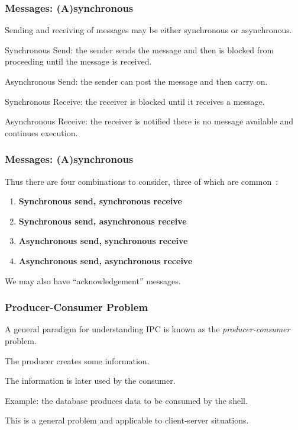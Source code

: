 \begin{frame}
\frametitle{Messages: (A)synchronous}

Sending and receiving of messages may be either synchronous or asynchronous. 

Synchronous Send: the sender sends the message and then is blocked from proceeding until the message is received. 

Asynchronous Send: the sender can post the message and then carry on. 

Synchronous Receive: the receiver is blocked until it receives a message. 

Asynchronous Receive: the receiver is notified there is no message available and continues execution.

\end{frame}

\begin{frame}
\frametitle{Messages: (A)synchronous}

Thus there are four combinations to consider, three of which are common~\cite{mte241}:

\begin{enumerate}
	\item \textbf{Synchronous send, synchronous receive} 
	\item \textbf{Synchronous send, asynchronous receive}
	\item \textbf{Asynchronous send, synchronous receive}
	\item \textbf{Asynchronous send, asynchronous receive}
\end{enumerate}

We may also have ``acknowledgement'' messages.

\end{frame}

\begin{frame}
\frametitle{Producer-Consumer Problem}

A general paradigm for understanding IPC is known as the \textit{producer-consumer} problem. 

The \alert{producer} creates some information.

The information is later used by the \alert{consumer}. 

Example: the database produces data to be consumed by the shell. 

This is a general problem and applicable to client-server situations.

\end{frame}

